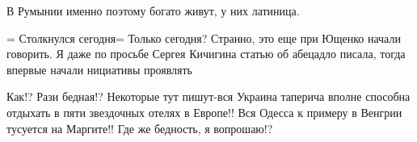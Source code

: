 \begin{itemize}
 
В Румынии именно поэтому богато живут, у них латиница.

 

= Столкнулся сегодня= Только сегодня? Странно, это еще при Ющенко начали
говорить. Я даже по просьбе Сергея Кичигина статью об абецадло писала, тогда
впервые начали нициативы проявлять

 

Как!? Рази бедная!? Некоторые тут пишут-вся Украина таперича вполне способна
отдыхать в пяти звездочных отелях в Европе!! Вся Одесса к примеру в Венгрии
тусуется на Маргите!! Где же бедность, я вопрошаю!?
\end{itemize}

